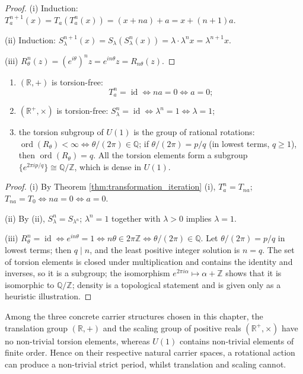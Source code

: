 \begin{proof}
(i) Induction: $T_a^{n+1}(x)=T_a(T_a^n(x))=(x+na)+a=x+(n+1)a$.

(ii) Induction: $S_\lambda^{n+1}(x)=S_\lambda(S_\lambda^n(x))=\lambda\cdot\lambda^n x=\lambda^{n+1}x$.

(iii) $R_\theta^n(z)=(e^{i\theta})^n z=e^{in\theta}z=R_{n\theta}(z)$.
\end{proof}

\begin{theorem}\label{thm:order_structure}
\begin{enumerate}[label=(\roman*)]
    \item $(\mathbb{R},+)$ is torsion-free:
    \[
    T_a^n=\operatorname{id}\iff na=0\iff a=0;
    \]
    \item $(\mathbb{R}^+,\times)$ is torsion-free: $S_\lambda^n=\operatorname{id}\iff \lambda^n=1\iff \lambda=1$;
    \item the torsion subgroup of $U(1)$ is the group of rational rotations: $\operatorname{ord}(R_\theta)<\infty\iff \theta/(2\pi)\in\mathbb{Q}$; if $\theta/(2\pi)=p/q$ (in lowest terms, $q\ge 1$), then $\operatorname{ord}(R_\theta)=q$. All the torsion elements form a subgroup $\{e^{2\pi i p/q}\}\cong\mathbb{Q}/\mathbb{Z}$, which is dense in $U(1)$.
\end{enumerate}
\end{theorem}

\begin{proof}
(i) By Theorem \ref{thm:transformation_iteration} (i), $T_a^n=T_{na}$; $T_{na}=T_0\iff na=0\iff a=0$.

(ii) By (ii), $S_\lambda^n=S_{\lambda^n}$; $\lambda^n=1$ together with $\lambda>0$ implies $\lambda=1$.

(iii) $R_\theta^n=\operatorname{id}\iff e^{in\theta}=1\iff n\theta\in 2\pi\mathbb{Z}\iff \theta/(2\pi)\in\mathbb{Q}$. Let $\theta/(2\pi)=p/q$ in lowest terms; then $q\mid n$, and the least positive integer solution is $n=q$. The set of torsion elements is closed under multiplication and contains the identity and inverses, so it is a subgroup; the isomorphism $e^{2\pi i\alpha}\mapsto \alpha+\mathbb{Z}$ shows that it is isomorphic to $\mathbb{Q}/\mathbb{Z}$; density is a topological statement and is given only as a heuristic illustration.
\end{proof}

\begin{corollary}\label{cor:rotation_unique}
Among the three concrete carrier structures chosen in this chapter, the translation group $(\mathbb{R},+)$ and the scaling group of positive reals $(\mathbb{R}^+,\times)$ have no non-trivial torsion elements, whereas $U(1)$ contains non-trivial elements of finite order. Hence on their respective natural carrier spaces, a rotational action can produce a non-trivial strict period, whilst translation and scaling cannot.
\end{corollary}

